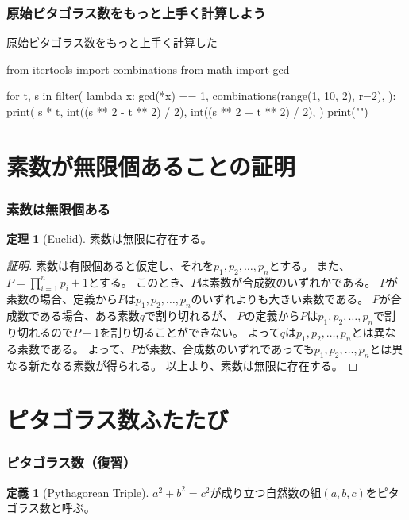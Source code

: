 \documentclass[dvipdfmx,11pt,notheorems]{beamer}
\theoremstyle{definition}
\newtheorem{theorem}{定理}
\newtheorem{definition}{定義}
\begin{document}
\begin{frame}[fragile]\frametitle{原始ピタゴラス数をもっと上手く計算しよう}

\begin{block}{原始ピタゴラス数をもっと上手く計算した}
\begin{pycode}
from itertools import combinations
from math import gcd

for t, s in filter(
    lambda x: gcd(*x) == 1,
    combinations(range(1, 10, 2), r=2),
):
    print(
        s * t,
        int((s ** 2 - t ** 2) / 2),
        int((s ** 2 + t ** 2) / 2),
    )
    print("\n")
\end{pycode}
\end{block}

\end{frame}




\section{素数が無限個あることの証明}

\begin{frame}\frametitle{素数は無限個ある}

\begin{theorem}[Euclid]
素数は無限に存在する。
\end{theorem}

\begin{proof}[証明]

素数は有限個あると仮定し、それを$p_{1}, p_{2}, \dots,  p_{n}$とする。
また、$P = \displaystyle \prod^{n}_{i=1}p_{i} + 1$とする。
このとき、$P$は素数が合成数のいずれかである。
$P$が素数の場合、定義から$P$は$p_{1}, p_{2}, \dots,  p_{n}$のいずれよりも大きい素数である。
$P$が合成数である場合、ある素数$q$で割り切れるが、
$P$の定義から$P$は$p_{1}, p_{2}, \dots,  p_{n}$で割り切れるので$P+1$を割り切ることができない。
よって$q$は$p_{1}, p_{2}, \dots,  p_{n}$とは異なる素数である。
よって、$P$が素数、合成数のいずれであっても$p_{1}, p_{2}, \dots,  p_{n}$とは異なる新たなる素数が得られる。
以上より、素数は無限に存在する。
\end{proof}

\end{frame}

\section{ピタゴラス数ふたたび}

\begin{frame}\frametitle{ピタゴラス数（復習）}

\begin{definition}[Pythagorean Triple]
$a^{2} + b^{2} = c^{2}$が成り立つ自然数の組$(a, b, c)$をピタゴラス数と呼ぶ。
\end{definition}

\end{frame}
\end{document}
